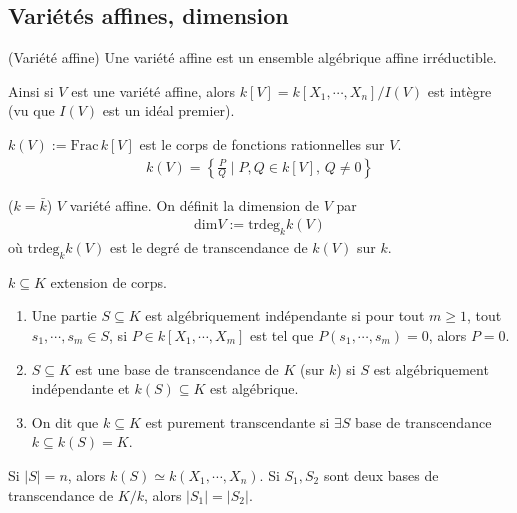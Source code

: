         \subsection{Variétés affines, dimension}
            \begin{defi} (Variété affine)
                Une variété affine est un ensemble algébrique affine irréductible.
            \end{defi}
            Ainsi si $V$ est une variété affine, alors $k[V] = k[X_1, \cdots, X_n]/I(V)$ est intègre (vu que $I(V)$ est un idéal premier).
            \begin{defi}
                $k(V) := \mathrm{Frac}\, k[V]$ est le corps de fonctions rationnelles sur $V$.
                \begin{align*}
                    k(V) = \left\{ \frac{P}{Q} \mid P,Q \in k[V],\, Q \neq 0 \right\}
                \end{align*}
            \end{defi}
            \begin{defi} ($k = \bar k$)
                $V$ variété affine. On définit la dimension de $V$ par
                \begin{align*}
                    \mathrm{dim} V := \mathrm{trdeg}_k k(V)
                \end{align*}
                où $\mathrm{trdeg}_k k(V)$ est le degré de transcendance de $k(V)$ sur $k$.
            \end{defi}
            \begin{defi}
                $k \subseteq K$ extension de corps.
                \begin{enumerate}
                    \item Une partie $S \subseteq K$ est algébriquement indépendante si pour tout $m \geq 1$, tout $s_1, \cdots, s_m \in S$, si $P \in k[X_1, \cdots, X_m]$ est tel que $P(s_1, \cdots, s_m) = 0$, alors $P = 0$.
                    \item $S \subseteq K$ est une base de transcendance de $K$ (sur $k$) si $S$ est algébriquement indépendante et $k(S) \subseteq K$ est algébrique.
                    \item On dit que $k \subseteq K$ est purement transcendante si $\exists S$ base de transcendance $k \subseteq k(S) = K$.
                \end{enumerate}
            \end{defi}
            \begin{remq}
                Si $|S| = n$, alors $k(S) \simeq k(X_1, \cdots, X_n)$. Si $S_1,S_2$ sont deux bases de transcendance de $K/k$, alors $|S_1| = |S_2|$. 
            \end{remq}
